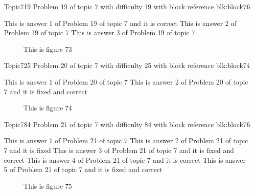 \documentclass[master]{exam}
\begin{document}
\begin{problem}[requires=blk:block76]{Topic7}{19}
	Problem 19 of topic 7 with difficulty 19 with block reference blk:block76
	\begin{answers}
		\answer[correct] This is answer 1 of Problem 19 of topic 7 and it is correct
		\answer This is answer 2 of Problem 19 of topic 7 
		\answer This is answer 3 of Problem 19 of topic 7 
	\end{answers}
\end{problem}



\begin{figure}
	\begin{center}
		This is figure 73 
		\label{fig:figure73}
	\end{center}
\end{figure}

\begin{problem}[requires=blk:block74]{Topic7}{25}
	Problem 20 of topic 7 with difficulty 25 with block reference blk:block74
	\begin{answers}
		\answer This is answer 1 of Problem 20 of topic 7 
		 This is answer 2 of Problem 20 of topic 7 and it is fixed and correct
	\end{answers}
\end{problem}



\begin{figure}
	\begin{center}
		This is figure 74 
		\label{fig:figure74}
	\end{center}
\end{figure}

\begin{problem}[requires=blk:block76]{Topic7}{84}
	Problem 21 of topic 7 with difficulty 84 with block reference blk:block76
	\begin{answers}
		\answer This is answer 1 of Problem 21 of topic 7 
		\answer[fixed] This is answer 2 of Problem 21 of topic 7 and it is fixed
		 This is answer 3 of Problem 21 of topic 7 and it is fixed and correct
		\answer[correct] This is answer 4 of Problem 21 of topic 7 and it is correct
		 This is answer 5 of Problem 21 of topic 7 and it is fixed and correct
	\end{answers}
\end{problem}



\begin{figure}
	\begin{center}
		This is figure 75 
		\label{fig:figure75}
	\end{center}
\end{figure}
\end{document}
